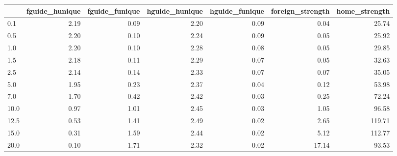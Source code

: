 \begin{tabular}{lrrrrrr}
\toprule
 & fguide_hunique & fguide_funique & hguide_hunique & hguide_funique & foreign_strength & home_strength \\
\midrule
0.1 & 2.19 & 0.09 & 2.20 & 0.09 & 0.04 & 25.74 \\
0.5 & 2.20 & 0.10 & 2.24 & 0.09 & 0.05 & 25.92 \\
1.0 & 2.20 & 0.10 & 2.28 & 0.08 & 0.05 & 29.85 \\
1.5 & 2.18 & 0.11 & 2.29 & 0.07 & 0.05 & 32.63 \\
2.5 & 2.14 & 0.14 & 2.33 & 0.07 & 0.07 & 35.05 \\
5.0 & 1.95 & 0.23 & 2.37 & 0.04 & 0.12 & 53.98 \\
7.0 & 1.70 & 0.42 & 2.42 & 0.03 & 0.25 & 72.24 \\
10.0 & 0.97 & 1.01 & 2.45 & 0.03 & 1.05 & 96.58 \\
12.5 & 0.53 & 1.41 & 2.49 & 0.02 & 2.65 & 119.71 \\
15.0 & 0.31 & 1.59 & 2.44 & 0.02 & 5.12 & 112.77 \\
20.0 & 0.10 & 1.71 & 2.32 & 0.02 & 17.14 & 93.53 \\
\bottomrule
\end{tabular}
